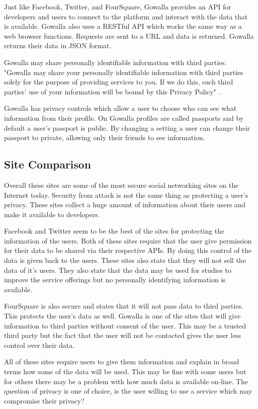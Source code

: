 Just like Facebook, Twitter, and FourSquare, Gowalla provides an API for
developers and users to connect to the platform and interact with the data that
is available. Gowalla also uses a RESTful API which works the same way as a web
browser functions. Requests are sent to a URL and data is returned. Gowalla
returns their data in JSON format.

Gowalla may share personally identifiable information with third parties.
"Gowalla may share your personally identifiable information with third parties
solely for the purpose of providing services to you. If we do this, such third
parties’ use of your information will be bound by this Privacy
Policy"~\cite{gwpp}.

Gowalla has privacy controls which allow a user to choose who can see what
information from their profile. On Gowalla profiles are called passports and by
default a user's passport is public. By changing a setting a user can change
their passport to private, allowing only their friends to see information.%

\subsection{Site Comparison} 
Overall these sites are some of the most secure social networking sites on the
Internet today. Security from attack is not the same thing as protecting a
user's privacy. These sites collect a huge amount of information about their
users and make it available to developers.

Facebook and Twitter seem to be the best of the sites for protecting the
information of the users. Both of these sites require that the user give
permission for their data to be shared via their respective APIs. By doing this
control of the data is given back to the users. These sites also state that they will not
sell the data of it's users. They also state that the data may be used for studies to
improve the service offerings but no personally identifying information is
available.

FourSquare is also secure and states that it will not pass data to third
parties. This protects the user's data  as well. Gowalla is one of the sites
that will give information to third parties without consent of the user. This
may be a trusted third party but the fact that the user will not be contacted
gives the user less control over their data.

All of these sites require users to give them information and explain in broad
terms how some of the data will be used. This may be fine with some users but
for others there may be a problem with how much data is available on-line. The
question of privacy is one of choice, is the user willing to use a service which
may compromise their privacy?%

